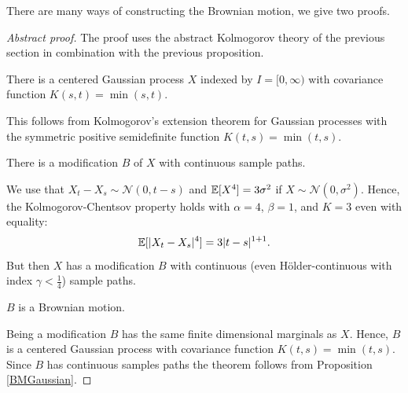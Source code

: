 There are many ways of constructing the Brownian motion, we give two proofs.
\begin{proof}[Abstract proof]
The proof uses the abstract Kolmogorov theory of the previous section in combination with the previous proposition.
\begin{lstep}
	There is a centered Gaussian process $X$ indexed by $I=[0,\infty)$ with covariance function $K(s,t)=\min(s,t)$.
\end{lstep}
	This follows from Kolmogorov's extension theorem for Gaussian processes with the symmetric positive semidefinite function $K(t,s)=\min(t,s)$.
\begin{lstep}
	There is a modification $B$ of $X$ with continuous sample paths.
\end{lstep}
	We use that $X_t-X_s\sim \mathcal N(0,t-s)$ and $\mathbb{E}[X^4]=3 \sigma^2$ if $X\sim \mathcal N(0,\sigma^2)$. Hence, the Kolmogorov-Chentsov property holds with $\alpha=4$, $\beta=1$, and $K=3$ even with equality:
	\begin{align*}
		\mathbb{E}[|X_t-X_s|^{4}]=3|t-s|^{1+1}.
	\end{align*}
But then $X$ has a modification $B$ with continuous (even H\"older-continuous with index $\gamma<\frac{1}{4}$) sample paths. 
\begin{lstep}
	$B$ is a Brownian motion.
\end{lstep}
Being a modification $B$ has the same finite dimensional marginals as $X$. Hence, $B$ is a centered Gaussian process with covariance function $K(t,s)=\min(t,s)$. Since $B$ has continuous samples paths the theorem follows from Proposition \ref{BMGaussian}.

\end{proof}
\marginpar{\textcolor{red}{Lecture 23}}

